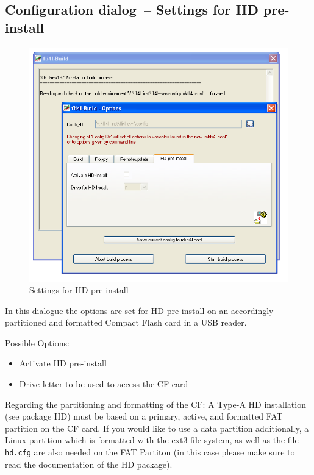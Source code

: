  \subsection{Configuration dialog~-- Settings for HD pre-install}
  \begin{figure}[ht!]
  \centering
  \includegraphics[width=\columnwidth]{win_build_hd_install}
  \caption{Settings for HD pre-install}
  \label{fig:win_build_hd_install}
  \end{figure}

   In this dialogue the options are set for HD pre-install on an
   accordingly partitioned and formatted Compact Flash card in a USB reader.

   Possible Options:
   \begin{itemize}
     \item Activate HD pre-install
     \item Drive letter to be used to access the CF card
  \end{itemize}

  Regarding the partitioning and formatting of the CF:
  A Type-A HD installation (see package HD) must be based on a primary, active,
  and formatted FAT partition on the CF card. If you would like to use a data partition
  additionally, a Linux partition which is formatted with the ext3 file system, as well as
  the file \texttt{hd.cfg} are also needed on the FAT Partiton (in this case please
  make sure to read the documentation of the HD package).

